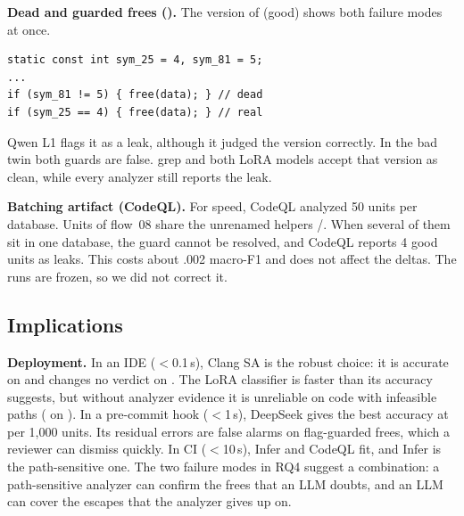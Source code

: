 \textbf{Dead and guarded frees (\Dead).}
The \Dead{} version of  (good) shows both failure modes at once.
\par\noindent\begin{minipage}{\columnwidth}
\begin{lstlisting}
static const int sym_25 = 4, sym_81 = 5;
...
if (sym_81 != 5) { free(data); } // dead
if (sym_25 == 4) { free(data); } // real
\end{lstlisting}
\end{minipage}\par
Qwen L1 flags it as a leak, although it judged the \Deb{} version correctly.
In the bad twin both guards are false.
grep and both LoRA models accept that version as clean, while every analyzer still reports the leak.

\textbf{Batching artifact (CodeQL).}
For speed, CodeQL analyzed 50 units per database.
Units of flow~08 share the unrenamed helpers /.
When several of them sit in one database, the guard cannot be resolved, and CodeQL reports 4 good units as leaks.
This costs about .002 macro-F1 and does not affect the \Dead{} deltas.
The runs are frozen, so we did not correct it.

\subsection{Implications}\label{sec:implications}

\textbf{Deployment.}
In an IDE ($<$0.1\,s), Clang SA is the robust choice: it is accurate on \Deb{} and changes no verdict on \Dead.
The LoRA classifier is faster than its accuracy suggests, but without analyzer evidence it is unreliable on code with infeasible paths
( on \Dead).
In a pre-commit hook ($<$1\,s), DeepSeek gives the best accuracy at \textyen{} per 1,000 units.
Its residual errors are false alarms on flag-guarded frees, which a reviewer can dismiss quickly.
In CI ($<$10\,s), Infer and CodeQL fit, and Infer is the path-sensitive one.
The two failure modes in RQ4 suggest a combination:
a path-sensitive analyzer can confirm the frees that an LLM doubts, and an LLM can cover the escapes that the analyzer gives up on.

